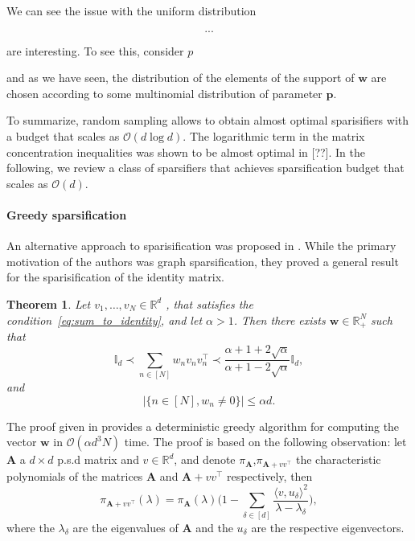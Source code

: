 \documentclass[twoside,11pt]{book}
\newtheorem{theorem}{Theorem}
\DeclareMathOperator{\Tran}{\intercal}
\begin{document}
We can see the issue with the uniform distribution 

\begin{equation}
...
\end{equation}

are interesting. To see this, consider $p$

 and as we have seen, the distribution of the elements of the support of $\bm{w}$ are chosen according to some multinomial distribution of parameter $\bm{p}$.

To summarize, random sampling allows to obtain almost optimal sparisifiers with a budget that scales as $\mathcal{O}(d \log d)$. The logarithmic term in the matrix concentration inequalities was shown to be almost optimal in [??]. 
In the following, we review a class of sparsifiers that achieves sparsification budget that scales as $\mathcal{O}(d)$.

\paragraph{Greedy sparsification}
An alternative approach to sparisification was proposed in \citep*{BaSpSr12}. While the primary motivation of the authors was graph sparsification, they proved a general result for the sparisification of the identity matrix.
\begin{theorem}\citep*{BaSpSr12}
Let $v_{1}, \dots, v_{N} \in \mathbb{R}^{d}$ , that satisfies the condition~\eqref{eq:sum_to_identity}, and let $\alpha >1$. Then there exists $\bm{w} \in \mathbb{R}_{+}^{N}$ such that
\begin{equation}
\mathbb{I}_{d} \prec \sum\limits_{n \in [N]}w_{n}v_{n}v_{n}^{\Tran} \prec \frac{\alpha +1 +2\sqrt{\alpha}}{\alpha +1 -2\sqrt{\alpha}} \mathbb{I}_{d},
\end{equation}
and
\begin{equation}
|\{n \in [N], w_{n} \neq 0\}| \leq \alpha d.
\end{equation}
\end{theorem}


The proof given in \citep{BaSpSr12} provides a deterministic greedy algorithm for computing the vector $\bm{w}$ in $\mathcal{O}(\alpha d^{3} N)$ time. The proof is based on the following observation: let $\bm{A}$ a $d\times d$ p.s.d matrix and $v \in \mathbb{R}^{d}$, and denote $\pi_{\bm{A}}$,$\pi_{\bm{A}+vv^{\Tran}}$ the characteristic polynomials of the matrices $\bm{A}$ and $\bm{A}+vv^{\Tran}$ respectively, then 
\begin{equation}
\pi_{\bm{A}+vv^{\Tran}}(\lambda) =  \pi_{\bm{A}}(\lambda) \bigg( 1- \sum\limits_{\delta \in [d]} \frac{\langle v,u_{\delta} \rangle^{2}}{\lambda-\lambda_{\delta}} \bigg), 
\end{equation}
where the $\lambda_{\delta}$ are the eigenvalues of $\bm{A}$ and the $u_{\delta}$ are the respective eigenvectors.
\end{document}
